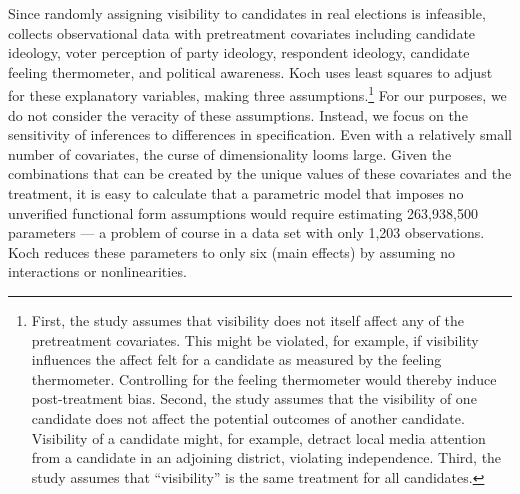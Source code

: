\documentclass[11pt,titlepage]{article}
\begin{document}
Since randomly assigning visibility to candidates in real elections is
infeasible, \citet{Koch02} collects observational data with
pretreatment covariates including candidate ideology, voter perception
of party ideology, respondent ideology, candidate feeling thermometer,
and political awareness.  Koch uses least squares to adjust for these
explanatory variables, making three assumptions.\footnote{First, the
  study assumes that visibility does not itself affect any of the
  pretreatment covariates.  This might be violated, for example, if
  visibility influences the affect felt for a candidate as measured by
  the feeling thermometer.  Controlling for the feeling thermometer
  would thereby induce post-treatment bias.  Second, the study assumes
  that the visibility of one candidate does not affect the potential
  outcomes of another candidate.  Visibility of a candidate might, for
  example, detract local media attention from a candidate in an
  adjoining district, violating independence.  Third, the study
  assumes that ``visibility'' is the same treatment for all
  candidates.}  For our purposes, we do not consider the veracity of
these assumptions.  Instead, we focus on the sensitivity of inferences
to differences in specification.  Even with a relatively small number
of covariates, the curse of dimensionality looms large.  Given the
combinations that can be created by the unique values of these
covariates and the treatment, it is easy to calculate that a
parametric model that imposes no unverified functional form
assumptions would require estimating 263,938,500 parameters --- a
problem of course in a data set with only 1,203 observations.  Koch
reduces these parameters to only six (main effects) by assuming no
interactions or nonlinearities.
\end{document}
